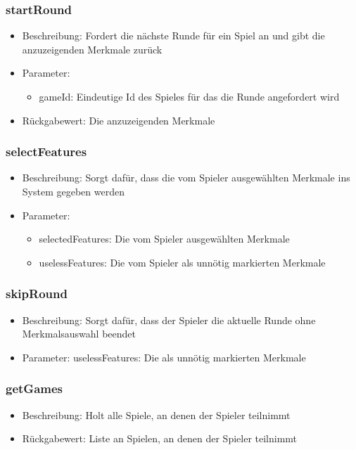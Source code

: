 \documentclass[a4paper]{scrreprt}
\begin{document}
	\subsubsection{startRound}
	\begin{itemize}
		\item Beschreibung: Fordert die nächste Runde für ein Spiel an und gibt die anzuzeigenden Merkmale zurück
		\item Parameter: 
		\begin{itemize}
			\item gameId: Eindeutige Id des Spieles für das die Runde angefordert wird
		\end{itemize}
		\item Rückgabewert: Die anzuzeigenden Merkmale
	\end{itemize}
	\subsubsection{selectFeatures}
	\begin{itemize}
		\item Beschreibung: Sorgt dafür, dass die vom Spieler ausgewählten Merkmale ins System gegeben werden
		\item Parameter: 
		\begin{itemize}
		\item selectedFeatures: Die vom Spieler ausgewählten Merkmale
		\item uselessFeatures: Die vom Spieler als unnötig markierten Merkmale
		\end{itemize}
	\end{itemize}
	\subsubsection{skipRound}
	\begin{itemize}
	\item Beschreibung: Sorgt dafür, dass der Spieler die aktuelle Runde ohne Merkmalsauswahl beendet
	\item Parameter: uselessFeatures: Die als unnötig markierten Merkmale
	\end{itemize}
	\subsubsection{getGames}
	\begin{itemize}
		\item Beschreibung: Holt alle Spiele, an denen der Spieler teilnimmt
		\item Rückgabewert: Liste an Spielen, an denen der Spieler teilnimmt
	\end{itemize}
\end{document}
